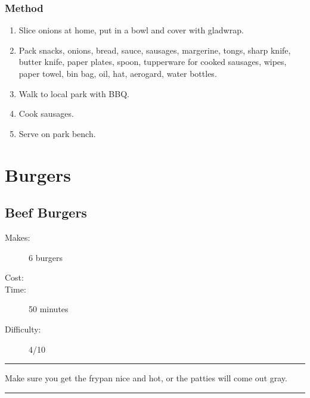 \documentclass[]{article}
\begin{document}
\subsubsection*{\Large Method}
\begin{enumerate}[font=\huge\color{accent}]
	\item Slice onions at home, put in a bowl and cover with gladwrap.
	\item Pack snacks, onions, bread, sauce, sausages, margerine, tongs, sharp knife, butter knife, paper plates, spoon, tupperware for cooked sausages, wipes, paper towel, bin bag, oil, hat, aerogard, water bottles.
	\item Walk to local park with BBQ.
	\item Cook sausages.
	\item Serve on park bench.
\end{enumerate}
\newpage
{}
\section*{\center\Huge\color{accent}Burgers}
\label{cat:Burgers}
\label{rec:Beef Burgers}
\subsection*{\center\huge Beef Burgers}
\begin{description}
\item[Makes:] 6 burgers
\item[Cost:] \textdollar
\item[Time:] 50 minutes
\item[Difficulty:] 4/10
\end{description}
\vspace{0.2cm}\hrule\vspace{0.5cm}
\begin{adjustwidth}{0.5 cm}{0.5 cm}

Make sure you get the frypan nice and hot, or the patties will come out gray. \hfill{}\color{black}

\end{adjustwidth}
\vspace{0.5cm}\hrule
\end{document}
